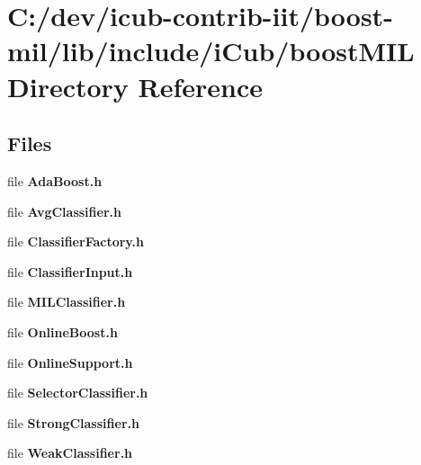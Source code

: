 \section{C\+:/dev/icub-\/contrib-\/iit/boost-\/mil/lib/include/i\+Cub/boost\+M\+I\+L Directory Reference}
\label{dir_f0ce595ec536a607538296da3a206f53}
\subsection*{Files}
\begin{DoxyCompactItemize}
\item 
file {\bfseries Ada\+Boost.\+h}
\item 
file {\bfseries Avg\+Classifier.\+h}
\item 
file {\bfseries Classifier\+Factory.\+h}
\item 
file {\bfseries Classifier\+Input.\+h}
\item 
file {\bfseries M\+I\+L\+Classifier.\+h}
\item 
file {\bfseries Online\+Boost.\+h}
\item 
file {\bfseries Online\+Support.\+h}
\item 
file {\bfseries Selector\+Classifier.\+h}
\item 
file {\bfseries Strong\+Classifier.\+h}
\item 
file {\bfseries Weak\+Classifier.\+h}
\end{DoxyCompactItemize}
